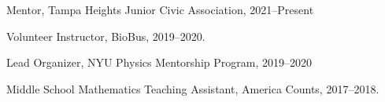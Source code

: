 \documentclass[12pt,letterpaper]{article}
\begin{document}
\begin{list}{}{\cvlist}

\item
  Mentor, Tampa Heights Junior Civic Association, 2021--Present

\item
  Volunteer Instructor, BioBus, 2019--2020.

\item
  Lead Organizer, NYU Physics Mentorship Program, 2019--2020
\item
  Middle School Mathematics Teaching Assistant, America Counts, 2017--2018.

\end{list}
\end{document}
